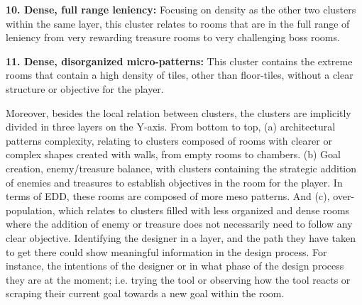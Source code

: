 \textbf{10. Dense, full range leniency:} Focusing on density as the other two clusters within the same layer, this cluster relates to rooms that are in the full range of leniency from very rewarding treasure rooms to very challenging boss rooms. %

\textbf{11. Dense, disorganized micro-patterns:} This cluster contains the extreme rooms that contain a high density of tiles, other than floor-tiles, without a clear structure or objective for the player.

Moreover, besides the local relation between clusters, the clusters are implicitly divided in three layers on the Y-axis. From bottom to top, (a) architectural patterns complexity, relating to clusters composed of rooms with clearer or complex shapes created with walls, from empty rooms to chambers. (b) Goal creation, enemy/treasure balance, with clusters containing the strategic addition of enemies and treasures to establish objectives in the room for the player. In terms of EDD, these rooms are composed of more meso patterns. And (c), over-population, which relates to clusters filled with less organized and dense rooms where the addition of enemy or treasure does not necessarily need to follow any clear objective. Identifying the designer in a layer, and the path they have taken to get there could show meaningful information in the design process. For instance, the intentions of the designer or in what phase of the design process they are at the moment; i.e. trying the tool or observing how the tool reacts or scraping their current goal towards a new goal within the room. 




